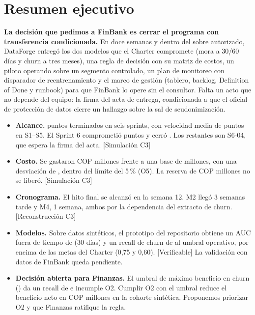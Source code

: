\documentclass[10pt,a4paper]{article}
\newcommand{\rot}[1]{\textsf{\scriptsize\color{gris}[#1]}}
\begin{document}
\section{Resumen ejecutivo}

\textbf{La decisión que pedimos a FinBank es cerrar el programa con transferencia condicionada.} En doce semanas y dentro del sobre autorizado, DataForge entregó los dos modelos que el Charter compromete (mora a 30/60 días y churn a tres meses), una regla de decisión con su matriz de costos, un piloto operando sobre un segmento controlado, un plan de monitoreo con disparador de reentrenamiento y el marco de gestión (tablero, backlog, Definition of Done y runbook) para que FinBank lo opere sin el consultor. Falta un acto que no depende del equipo: la firma del acta de entrega, condicionada a que el oficial de protección de datos cierre un hallazgo sobre la sal de seudonimización.

\begin{itemize}
\item \textbf{Alcance.} \PuntosTotal{} puntos terminados en seis sprints, con velocidad media de \VelMedia{} puntos en S1--S5. El Sprint 6 comprometió \SseisComp{} puntos y cerró \SseisDone{}. Los \SseisPend{} restantes son S6-04, que espera la firma del acta. \rot{Simulación C3}
\item \textbf{Costo.} Se gastaron COP \GastoTotal{} millones frente a una base de \BaseTotal{} millones, con una desviación de \DesvCosto{}, dentro del límite del 5\,\% (O5). La reserva de COP \Reserva{} millones no se liberó. \rot{Simulación C3}
\item \textbf{Cronograma.} El hito final se alcanzó en la semana 12. M2 llegó 3 semanas tarde y M4, 1 semana, ambos por la dependencia del extracto de churn. \rot{Reconstrucción C3}
\item \textbf{Modelos.} Sobre datos sintéticos, el prototipo del repositorio obtiene un AUC fuera de tiempo de \AUCtreinta{} (30 días) y un recall de churn de \RecallOp{} al umbral operativo, por encima de las metas del Charter (0,75 y 0,60). \rot{Verificable} La validación con datos de FinBank queda pendiente.
\item \textbf{Decisión abierta para Finanzas.} El umbral de máximo beneficio en churn (\CorteCosto) da un recall de \RecallCosto{} e incumple O2. Cumplir O2 con el umbral \CorteOp{} reduce el beneficio neto en COP \BenefDif{} millones en la cohorte sintética. Proponemos priorizar O2 y que Finanzas ratifique la regla.
\end{itemize}
\end{document}
